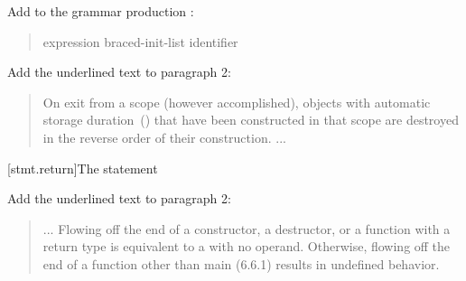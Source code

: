 Add  to the grammar production :

\begin{quote}
  \begin{bnf}
    \br
    \br
    \br
     expression\opt \terminal{;}\br
     braced-init-list \terminal{;}\br
     \br
     identifier \terminal{;}
  \end{bnf}
\end{quote}

Add the underlined text to paragraph 2:

\begin{quote}
\setcounter{Paras}{1}
\pnum
On exit from a scope (however accomplished), objects with automatic storage
duration~() that have been constructed in that scope are destroyed
in the reverse order of their construction.
...
\end{quote}

\setcounter{subsection}{2}
[stmt.return]{The  statement}%
%
%

%

Add the underlined text to paragraph 2:

\begin{quote}
\setcounter{Paras}{1}
  \pnum ... Flowing off the end of
  a constructor,
  a destructor, or
  a function  with a \cv{}~ return type is
  equivalent to a  with no operand. Otherwise, flowing off the end of a function other than main (6.6.1) 
  results in undefined behavior.
\end{quote}

